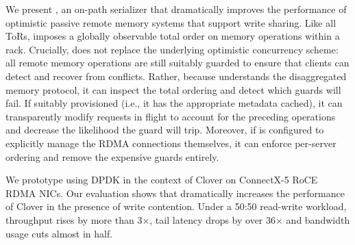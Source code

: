 We present {\sword}, an on-path serializer
that dramatically improves the performance of optimistic passive
remote memory systems that support write sharing.  Like all ToRs,
{\sword} imposes a globally observable total order on memory
operations within a rack.  Crucially, {\sword} does not replace the
underlying optimistic concurrency scheme: all remote memory operations
are still suitably guarded to ensure that clients can detect and
recover from conflicts.  Rather, because {\sword} understands the
disaggregated memory protocol, it can inspect the total ordering and
detect which guards will fail.  If suitably provisioned (i.e., it has
the appropriate metadata cached), it can transparently modify requests
in flight to account for the preceding operations and decrease the
likelihood the guard will trip.  Moreover, if {\sword} is configured
to explicitly manage the RDMA connections themselves, it can enforce
per-server ordering and remove the expensive guards entirely.

We prototype {\sword} using DPDK in the context of Clover on
ConnectX-5 RoCE RDMA NICs.  Our evaluation shows that {\sword}
dramatically increases the performance of Clover in the presence of
write contention.  Under a 50:50 read-write workload, throughput rises
by more than 3$\times$, tail latency drops by over 36$\times$ and
bandwidth usage cuts almost in half.

